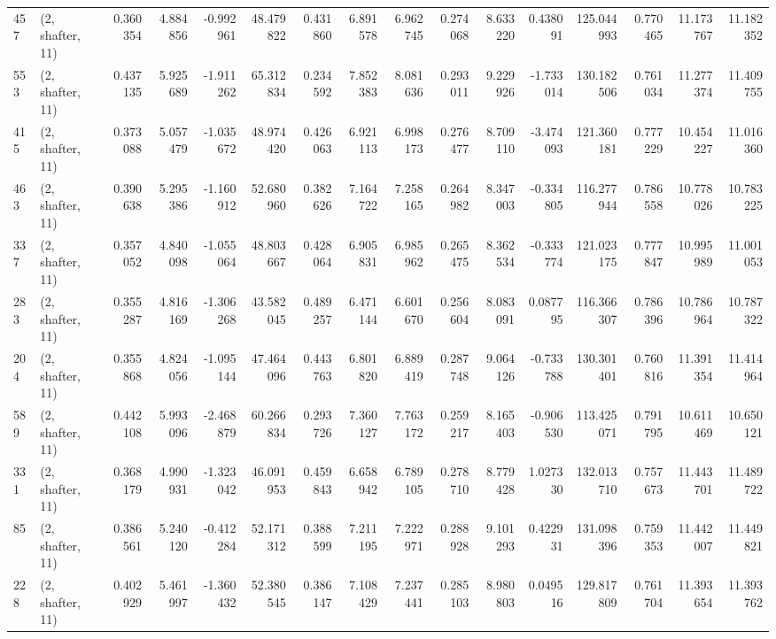 \begin{tabular}{llrrrrrrrrrrrrrr}
457 &  (2, shafter, 11) &   0.360354 &   4.884856 &  -0.992961 &    48.479822 &   0.431860 &   6.891578 &   6.962745 &  0.274068 &   8.633220 &   0.438091 &    125.044993 &   0.770465 &  11.173767 &   11.182352 \\
553 &  (2, shafter, 11) &   0.437135 &   5.925689 &  -1.911262 &    65.312834 &   0.234592 &   7.852383 &   8.081636 &  0.293011 &   9.229926 &  -1.733014 &    130.182506 &   0.761034 &  11.277374 &   11.409755 \\
415 &  (2, shafter, 11) &   0.373088 &   5.057479 &  -1.035672 &    48.974420 &   0.426063 &   6.921113 &   6.998173 &  0.276477 &   8.709110 &  -3.474093 &    121.360181 &   0.777229 &  10.454227 &   11.016360 \\
463 &  (2, shafter, 11) &   0.390638 &   5.295386 &  -1.160912 &    52.680960 &   0.382626 &   7.164722 &   7.258165 &  0.264982 &   8.347003 &  -0.334805 &    116.277944 &   0.786558 &  10.778026 &   10.783225 \\
337 &  (2, shafter, 11) &   0.357052 &   4.840098 &  -1.055064 &    48.803667 &   0.428064 &   6.905831 &   6.985962 &  0.265475 &   8.362534 &  -0.333774 &    121.023175 &   0.777847 &  10.995989 &   11.001053 \\
283 &  (2, shafter, 11) &   0.355287 &   4.816169 &  -1.306268 &    43.582045 &   0.489257 &   6.471144 &   6.601670 &  0.256604 &   8.083091 &   0.087795 &    116.366307 &   0.786396 &  10.786964 &   10.787322 \\
204 &  (2, shafter, 11) &   0.355868 &   4.824056 &  -1.095144 &    47.464096 &   0.443763 &   6.801820 &   6.889419 &  0.287748 &   9.064126 &  -0.733788 &    130.301401 &   0.760816 &  11.391354 &   11.414964 \\
589 &  (2, shafter, 11) &   0.442108 &   5.993096 &  -2.468879 &    60.266834 &   0.293726 &   7.360127 &   7.763172 &  0.259217 &   8.165403 &  -0.906530 &    113.425071 &   0.791795 &  10.611469 &   10.650121 \\
331 &  (2, shafter, 11) &   0.368179 &   4.990931 &  -1.323042 &    46.091953 &   0.459843 &   6.658942 &   6.789105 &  0.278710 &   8.779428 &   1.027330 &    132.013710 &   0.757673 &  11.443701 &   11.489722 \\
85  &  (2, shafter, 11) &   0.386561 &   5.240120 &  -0.412284 &    52.171312 &   0.388599 &   7.211195 &   7.222971 &  0.288928 &   9.101293 &   0.422931 &    131.098396 &   0.759353 &  11.442007 &   11.449821 \\
228 &  (2, shafter, 11) &   0.402929 &   5.461997 &  -1.360432 &    52.380545 &   0.386147 &   7.108429 &   7.237441 &  0.285103 &   8.980803 &   0.049516 &    129.817809 &   0.761704 &  11.393654 &   11.393762 \\

\end{tabular}
